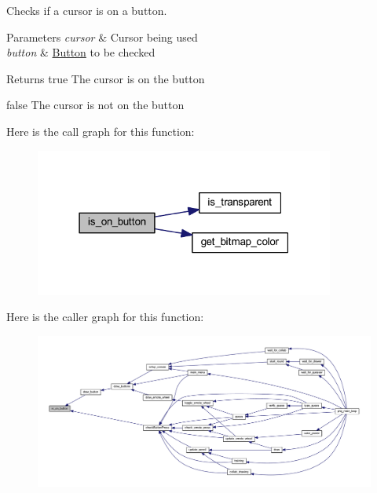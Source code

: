 Checks if a cursor is on a button. 


\begin{DoxyParams}{Parameters}
{\em cursor} & Cursor being used \\
\hline
{\em button} & \mbox{\hyperlink{struct_button}{Button}} to be checked \\
\hline
\end{DoxyParams}
\begin{DoxyReturn}{Returns}
true The cursor is on the button 

false The cursor is not on the button 
\end{DoxyReturn}
Here is the call graph for this function\+:\nopagebreak
\begin{figure}[H]
\begin{center}
\leavevmode
\includegraphics[width=279pt]{group__sprite_ga8fe18a5b062a81b4b99dc62f0643446c_cgraph}
\end{center}
\end{figure}
Here is the caller graph for this function\+:\nopagebreak
\begin{figure}[H]
\begin{center}
\leavevmode
\includegraphics[width=350pt]{group__sprite_ga8fe18a5b062a81b4b99dc62f0643446c_icgraph}
\end{center}
\end{figure}
\mbox{\label{group__sprite_gaa77fff83958c7ed7ab6e99a25d574ce2}} 
